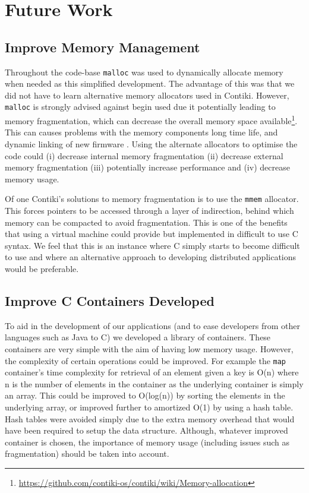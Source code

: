\section{Future Work}

\subsection{Improve Memory Management}

Throughout the code-base \verb|malloc| was used to dynamically allocate memory when needed as this simplified development. The advantage of this was that we did not have to learn alternative memory allocators used in Contiki. However, \verb|malloc| is strongly advised against begin used due it potentially leading to memory fragmentation, which can decrease the overall memory space available\footnote{\url{https://github.com/contiki-os/contiki/wiki/Memory-allocation}}. This can causes problems with the memory components long time life, and dynamic linking of new firmware \cite{Dai:2004:EEL:1031495.1031516,Dunkels:2006:RDL:1182807.1182810}. Using the alternate allocators to optimise the code could (i) decrease internal memory fragmentation (ii) decrease external memory fragmentation (iii) potentially increase performance and (iv) decrease memory usage.

Of one Contiki's solutions to memory fragmentation is to use the \verb|mmem| allocator. This forces pointers to be accessed through a layer of indirection, behind which memory can be compacted to avoid fragmentation. This is one of the benefits that using a virtual machine could provide but implemented in difficult to use C syntax. We feel that this is an instance where C simply starts to become difficult to use and where an alternative approach to developing distributed applications would be preferable.

\subsection{Improve C Containers Developed}

To aid in the development of our applications (and to ease developers from other languages such as Java to C) we developed a library of containers. These containers are very simple with the aim of having low memory usage. However, the complexity of certain operations could be improved. For example the \verb|map| container's time complexity for retrieval of an element given a key is O(n) where n is the number of elements in the container as the underlying container is simply an array. This could be improved to O(log(n)) by sorting the elements in the underlying array, or improved further to amortized O(1) by using a hash table. Hash tables were avoided simply due to the extra memory overhead that would have been required to setup the data structure. Although, whatever improved container is chosen, the importance of memory usage (including issues such as fragmentation) should be taken into account.

